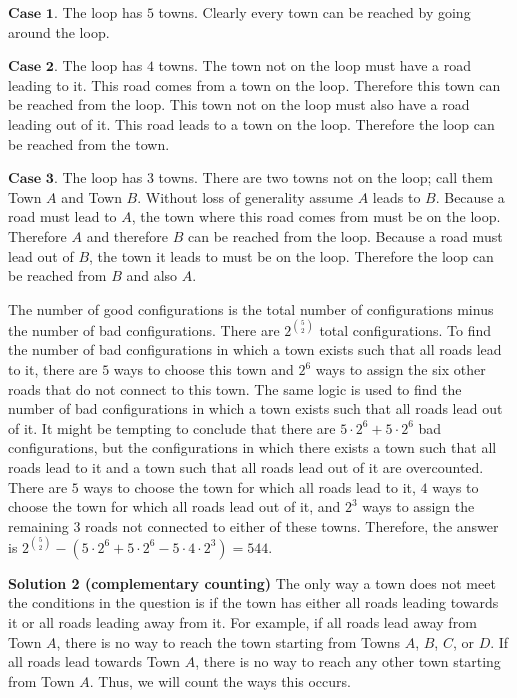 \documentclass[a4paper,11pt]{article}
\begin{document}
$\textbf{Case 1}$. The loop has $5$ towns. Clearly every town can be reached by going around the loop.

$\textbf{Case 2}$. The loop has $4$ towns. The town not on the loop must have a road leading to it. This road comes from a town on the loop. Therefore this town can be reached from the loop. This town not on the loop must also have a road leading out of it. This road leads to a town on the loop. Therefore the loop can be reached from the town.

$\textbf{Case 3}$. The loop has $3$ towns. There are two towns not on the loop; call them Town $A$ and Town $B$. Without loss of generality assume $A$ leads to $B$. Because a road must lead to $A$, the town where this road comes from must be on the loop. Therefore $A$ and therefore $B$ can be reached from the loop. Because a road must lead out of $B$, the town it leads to must be on the loop. Therefore the loop can be reached from $B$ and also $A$.

The number of good configurations is the total number of configurations minus the number of bad configurations. There are $2^{{5\choose2}}$ total configurations. To find the number of bad configurations in which a town exists such that all roads lead to it, there are $5$ ways to choose this town and $2^6$ ways to assign the six other roads that do not connect to this town. The same logic is used to find the number of bad configurations in which a town exists such that all roads lead out of it. It might be tempting to conclude that there are $5 \cdot 2^6+5 \cdot 2^6$ bad configurations, but the configurations in which there exists a town such that all roads lead to it and a town such that all roads lead out of it are overcounted. There are $5$ ways to choose the town for which all roads lead to it, $4$ ways to choose the town for which all roads lead out of it, and $2^3$ ways to assign the remaining $3$ roads not connected to either of these towns. Therefore, the answer is $2^{{5\choose2}}-(5 \cdot 2^6+5 \cdot 2^6-5\cdot 4 \cdot 2^3)=\boxed{544}$.

\textbf{Solution 2 (complementary counting)}
The only way a town does not meet the conditions in the question is if the town has either all roads leading towards it or all roads leading away from it. For example, if all roads lead away from Town $A$, there is no way to reach the town starting from Towns $A$, $B$, $C$, or $D$. If all roads lead towards Town $A$, there is no way to reach any other town starting from Town $A$. Thus, we will count the ways this occurs.
\end{document}
